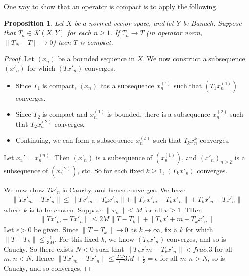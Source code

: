 \documentclass[10pt, oneside, reqno]{amsbook}
\theoremstyle{plain}%
\newtheorem{prop}[thm]{Proposition}
\theoremstyle{definition}
\theoremstyle{remark}
\begin{document}
One way to show that an operator is compact is to apply the following.  
\begin{prop}
    Let $X$ be a normed vector space, and let $Y$ be Banach.  Suppose that $T_n \in \mathcal K(X, Y)$ for each $n \geq 1$.  If $T_n \rightarrow T$ (in operator norm, $\| T_N - T \| \rightarrow 0$) then $T$ is compact.  
\end{prop}
\begin{proof}
    Let $(x_n)$ be a bounded sequence in $X$.  We now construct a subsequence $(x'_n)$ for which $(Tx'_n)$ converges.  \begin{itemize}
        \item Since $T_1$ is compact, $(x_n)$ has a subsequence $x^{(1)}_n$ such that $(T_1 x^{(1)}_n)$ converges. 
        \item Since $T_2$ is compact and $x^{(1)}_n$ is bounded, there is a subsequence $x_n^{(2)}$ such that $T_2 x^{(2)}_n$ converges. 
        \item Continuing, we can form a subsequence $x^{(k)}_n$ such that $T_k x^{k}_n$ converges. 
    \end{itemize}

Let $x_n' = x_n^{(n)}$.  Then $(x'_n)$ is a subsequence of $(x_n^{(1)})$, and $(x'_n)_{n \geq 2}$ is a subsequence of $(x_n^{(2)})$, etc.  So for each fixed $k \geq 1$, $(T_k x'_n)$ converges.  

We now show $T x'_n$ is Cauchy, and hence converges.  We have \begin{align*}
    \| Tx'_m - T x'_n \| \leq \| T x'_m - T_k x'_m \| + \| T_K x'_m - T_k x'_n \| + T_k x'_n - T x'_n \|
\end{align*} where $k$ is to be chosen.  Suppose $\| x_n \| \leq M$ for all $n \geq 1$.  THen \begin{align*}
    \| Tx'_m - T x'_n \| \leq 2 M \| T - T_k \| + \| T_k x'+m - T_k x'_n \|
\end{align*} Let $\epsilon > 0$ be given. Since $\| T - T_k \| \rightarrow 0$ as $ k \rightarrow \infty$, fix a $k$ for which $\| T - T_k \| \leq \frac{\epsilon}{3M}$.  For this fixed $k$, we know $(T_k x'_n)$ converges, and so is Cauchy.  So there exists $N < 0$ such that $\| T_k x'm - T_k x'_n\| < frac{\epsilon}{3}$ for all $m,n < N$.  Hence $\|T x'_m - Tx'_n \| \leq \frac{2M}{\epsilon}{3M} + \frac{\epsilon}{3} = \epsilon$ for all $m , n > N$, so is Cauchy, and so converges. 
\end{proof}
\end{document}
